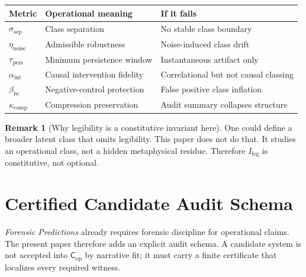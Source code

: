 \documentclass[11pt,a4paper]{article}
\theoremstyle{definition}
\newtheorem{remark}[theorem]{Remark}
\newcommand{\Cop}{\mathsf{C}_{\mathrm{op}}}
\newcommand{\Ileg}{I_{\mathrm{leg}}}
\begin{document}
\begin{center}
\small
\renewcommand{\arraystretch}{1.14}
\setlength{\tabcolsep}{4.5pt}
\begin{tabularx}{\textwidth}{>{\raggedright\arraybackslash}p{2.15cm} Y Y}
\toprule
Metric & Operational meaning & If it fails \\
\midrule
$\sigma_{\mathrm{sep}}$ & Class separation & No stable class boundary \\
$\eta_{\mathrm{noise}}$ & Admissible robustness & Noise-induced class drift \\
$\tau_{\mathrm{pers}}$ & Minimum persistence window & Instantaneous artifact only \\
$\alpha_{\mathrm{int}}$ & Causal intervention fidelity & Correlational but not causal classing \\
$\beta_{\mathrm{nc}}$ & Negative-control protection & False positive class inflation \\
$\kappa_{\mathrm{comp}}$ & Compression preservation & Audit summary collapses structure \\
\bottomrule
\end{tabularx}
\end{center}

\begin{remark}[Why legibility is a constitutive invariant here]
One could define a broader latent class that omits legibility. This paper does not do that. It studies an operational class, not a hidden metaphysical residue. Therefore $\Ileg$ is constitutive, not optional.
\end{remark}


\section{Certified Candidate Audit Schema}
\textit{Forensic Predictions} already requires forensic discipline for operational claims. The present paper therefore adds an explicit audit schema. A candidate system is not accepted into $\Cop$ by narrative fit; it must carry a finite certificate that localizes every required witness.
\end{document}
